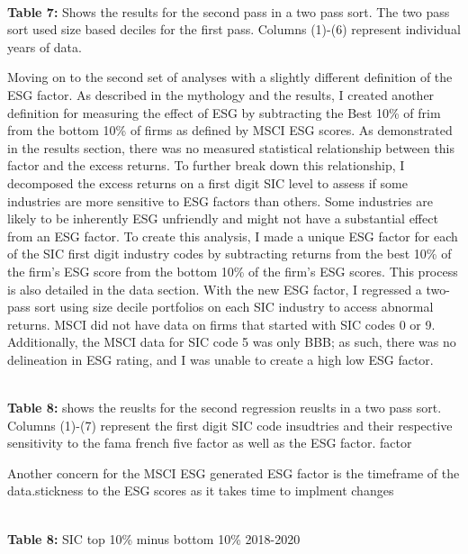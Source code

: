 \begin{center}
    \paperspacingnarrow
    \\
    \textbf{Table 7:} Shows the results for the second pass in a two pass sort. The two pass sort used size based deciles for the first pass. Columns (1)-(6) represent individual years of data. 
    \paperspacingwide
\end{center}

 
 Moving on to the second set of analyses with a slightly different definition of the ESG factor.  As described in the mythology and the results, I created another definition for measuring the effect of ESG by subtracting the Best 10\% of frim from the bottom 10\% of firms as defined by MSCI ESG scores. As demonstrated in the results section, there was no measured statistical relationship between this factor and the excess returns. To further break down this relationship, I decomposed the excess returns on a first digit SIC level to assess if some industries are more sensitive to ESG factors than others. Some industries are likely to be inherently ESG unfriendly and might not have a substantial effect from an ESG factor. To create this analysis, I made a unique ESG factor for each of the SIC first digit industry codes by subtracting returns from the best 10\% of the firm's ESG score from the bottom 10\% of the firm's ESG scores. This process is also detailed in the data section. With the new ESG factor, I regressed a two-pass sort using size decile portfolios on each SIC industry to access abnormal returns. MSCI did not have data on firms that started with SIC codes 0 or  9. Additionally, the MSCI data for SIC code 5 was only BBB; as such, there was no delineation in ESG rating, and I was unable to create a high low ESG factor. 

\begin{center}
    \paperspacingnarrow
    \\
    \textbf{Table 8:} shows the reuslts for the second regression reuslts in a two pass sort. Columns (1)-(7) represent the first digit SIC code insudtries and their respective sensitivity to the fama french five factor as well as the ESG factor. factor\\
    
    \paperspacingwide
\end{center}
 
 
 Another concern for the MSCI ESG generated ESG factor is the timeframe of the data.stickness to the ESG scores as it takes time to implment changes 
 \begin{center}
    \paperspacingnarrow
    \\
    \textbf{Table 8:} SIC top 10\% minus bottom 10\% 2018-2020
    
    \paperspacingwide
\end{center}
 
 

